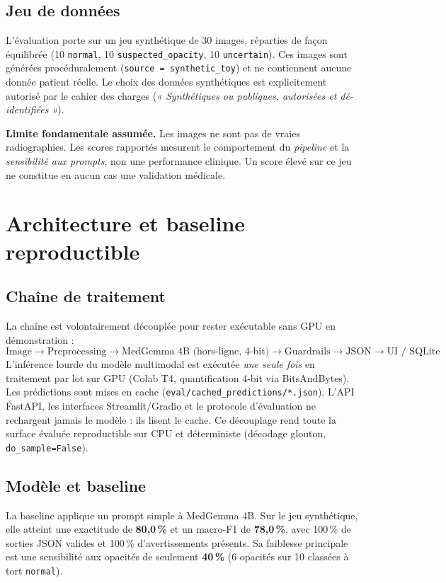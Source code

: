 \documentclass[11pt,a4paper]{article}
\begin{document}
\subsection{Jeu de données}
L'évaluation porte sur un jeu synthétique de 30 images, réparties de façon équilibrée
(10 \texttt{normal}, 10 \texttt{suspected\_opacity}, 10 \texttt{uncertain}). Ces images sont
générées procéduralement (\texttt{source = synthetic\_toy}) et ne contiennent aucune donnée
patient réelle. Le choix des données synthétiques est explicitement autorisé par le cahier des
charges (\emph{« Synthétiques ou publiques, autorisées et dé-identifiées »}).

\begin{keybox}
\textbf{Limite fondamentale assumée.} Les images ne sont pas de vraies radiographies. Les scores
rapportés mesurent le comportement du \emph{pipeline} et la \emph{sensibilité aux prompts}, non
une performance clinique. Un score élevé sur ce jeu ne constitue en aucun cas une validation
médicale.
\end{keybox}

\section{Architecture et baseline reproductible}

\subsection{Chaîne de traitement}
La chaîne est volontairement découplée pour rester exécutable sans GPU en démonstration :
\[
\text{Image} \rightarrow \text{Preprocessing} \rightarrow \text{MedGemma 4B (hors-ligne, 4-bit)} \rightarrow \text{Guardrails} \rightarrow \text{JSON} \rightarrow \text{UI / SQLite}
\]
L'inférence lourde du modèle multimodal est exécutée \emph{une seule fois} en traitement par lot
sur GPU (Colab T4, quantification 4-bit via BitsAndBytes). Les prédictions sont mises en cache
(\texttt{eval/cached\_predictions/*.json}). L'API FastAPI, les interfaces Streamlit/Gradio et le
protocole d'évaluation ne rechargent jamais le modèle : ils lisent le cache. Ce découplage rend
toute la surface évaluée reproductible sur CPU et déterministe (décodage glouton,
\texttt{do\_sample=False}).

\subsection{Modèle et baseline}
La baseline applique un prompt simple à MedGemma 4B. Sur le jeu synthétique, elle atteint une
exactitude de \textbf{80,0\,\%} et un macro-F1 de \textbf{78,0\,\%}, avec 100\,\% de sorties JSON
valides et 100\,\% d'avertissements présents. Sa faiblesse principale est une sensibilité aux
opacités de seulement \textbf{40\,\%} (6 opacités sur 10 classées à tort \texttt{normal}).
\end{document}
